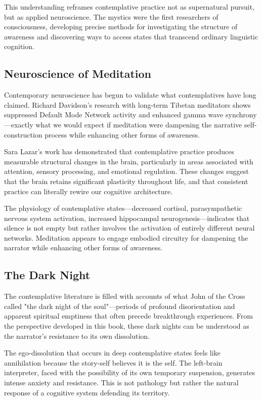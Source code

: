 This understanding reframes contemplative practice not as supernatural pursuit, but as applied neuroscience. The mystics were the first researchers of consciousness, developing precise methods for investigating the structure of awareness and discovering ways to access states that transcend ordinary linguistic cognition.

\subsection{Neuroscience of Meditation}

Contemporary neuroscience has begun to validate what contemplatives have long claimed. Richard Davidson's research with long-term Tibetan meditators shows suppressed Default Mode Network activity and enhanced gamma wave synchrony—exactly what we would expect if meditation were dampening the narrative self-construction process while enhancing other forms of awareness.

Sara Lazar's work has demonstrated that contemplative practice produces measurable structural changes in the brain, particularly in areas associated with attention, sensory processing, and emotional regulation. These changes suggest that the brain retains significant plasticity throughout life, and that consistent practice can literally rewire our cognitive architecture.

The physiology of contemplative states—decreased cortisol, parasympathetic nervous system activation, increased hippocampal neurogenesis—indicates that silence is not empty but rather involves the activation of entirely different neural networks. Meditation appears to engage embodied circuitry for dampening the narrator while enhancing other forms of awareness.

\subsection{The Dark Night}

The contemplative literature is filled with accounts of what John of the Cross called "the dark night of the soul"—periods of profound disorientation and apparent spiritual emptiness that often precede breakthrough experiences. From the perspective developed in this book, these dark nights can be understood as the narrator's resistance to its own dissolution.

The ego-dissolution that occurs in deep contemplative states feels like annihilation because the story-self believes it is the self. The left-brain interpreter, faced with the possibility of its own temporary suspension, generates intense anxiety and resistance. This is not pathology but rather the natural response of a cognitive system defending its territory.


